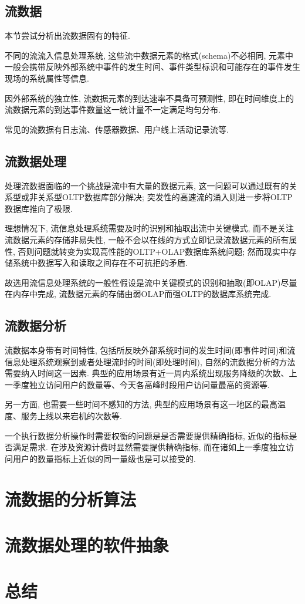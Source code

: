 \documentclass{article}
\begin{document}
\subsection{流数据}

本节尝试分析出流数据固有的特征. 

不同的流流入信息处理系统, 这些流中数据元素的格式(schema)不必相同, 元素中一般会携带反映外部系统中事件的发生时间、事件类型标识和可能存在的事件发生现场的系统属性等信息. 

因外部系统的独立性, 流数据元素的到达速率不具备可预测性, 即在时间维度上的流数据元素的到达事件数量这一统计量不一定满足均匀分布.

常见的流数据有日志流、传感器数据、用户线上活动记录流等.

\subsection{流数据处理}

处理流数据面临的一个挑战是流中有大量的数据元素, 这一问题可以通过既有的关系型或非关系型OLTP数据库部分解决; 突发性的高速流的涌入则进一步将OLTP数据库推向了极限.

理想情况下, 流信息处理系统需要及时的识别和抽取出流中关键模式, 而不是关注流数据元素的存储非易失性, 一般不会以在线的方式立即记录流数据元素的所有属性, 否则问题就转变为实现高性能的OLTP+OLAP数据库系统问题; 然而现实中存储系统中数据写入和读取之间存在不可抗拒的矛盾.

故选用流信息处理系统的一般性假设是流中关键模式的识别和抽取(即OLAP)尽量在内存中完成, 流数据元素的存储由弱OLAP而强OLTP的数据库系统完成.

\subsection{流数据分析}

流数据本身带有时间特性, 包括所反映外部系统时间的发生时间(即事件时间)和流信息处理系统观察到或者处理流时的时间(即处理时间), 自然的流数据分析的方法需要纳入时间这一因素. 典型的应用场景有近一周内系统出现服务降级的次数、上一季度独立访问用户的数量等、今天各高峰时段用户访问量最高的资源等.

另一方面, 也需要一些时间不感知的方法, 典型的应用场景有这一地区的最高温度、服务上线以来宕机的次数等.

一个执行数据分析操作时需要权衡的问题是是否需要提供精确指标, 近似的指标是否满足需求. 在涉及资源计费时显然需要提供精确指标, 而在诸如上一季度独立访问用户的数量指标上近似的同一量级也是可以接受的.

\newpage 
\section{流数据的分析算法}

\newpage 
\section{流数据处理的软件抽象}

\cite{storm-blueprints}
\cite{frontiers-mda}
\cite{mmd}
\cite{dataflow-model}

\newpage 
\section{总结}

\newpage
\renewcommand\refname{参考文献}  

\end{document}
